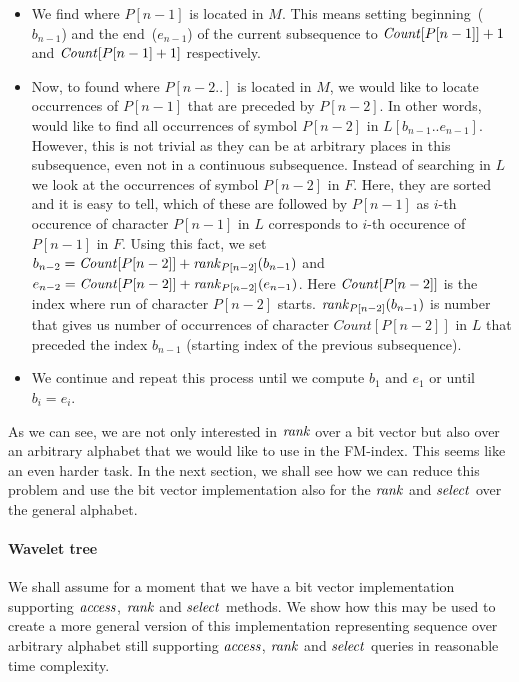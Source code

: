 \begin{itemize}
	\item We find where $P[n-1]$ is located in $M$. This means setting beginning~($b_{n-1}$) and
	the end~($e_{n-1}$) of the current subsequence to $\mathit{Count}[P[n-1]]+1$ and $\mathit{Count}[P[n-1]+1]$
	respectively.
	\item Now, to found where $P[n-2..]$ is located in $M$, we would like to locate occurrences
	of $P[n-1]$ that are preceded by $P[n-2]$. In other words, would like to find all
	occurrences of symbol $P[n-2]$ in $L[b_{n-1}..e_{n-1}]$. However, this is not trivial
	as they can be at arbitrary places in this subsequence, even not in a continuous
	subsequence. Instead of searching in $L$ we look at the occurrences of symbol $P[n-2]$ in
	$F$. Here, they are sorted and it is easy to tell, which of these are followed by
	$P[n-1]$ as $i$-th occurence of character $P[n-1]$ in $L$ corresponds to $i$-th
	occurence of $P[n-1]$ in $F$. Using this fact, we set
	$b_{n-2} = \mathit{Count}[P[n-2]] + \mathit{rank}_{P[n-2]}(b_{n-1})$ and
	$e_{n-2} = \mathit{Count}[P[n-2]] + \mathit{rank}_{P[n-2]}(e_{n-1})$. Here $\mathit{Count}[P[n-2]]$
	is the index where run of character $P[n-2]$ starts. $\mathit{rank}_{P[n-2]}(b_{n-1})$
	is number that gives us number of occurrences of character $Count[P[n-2]]$ in $L$ that
	preceded the index $b_{n-1}$ (starting index of the previous subsequence).
	\item We continue and repeat this process until we compute $b_1$ and $e_1$ or until
	$b_i=e_i$.
\end{itemize}

As we can see, we are not only interested in $\mathit{rank}$ over a bit vector but also over an arbitrary
alphabet that we would like to use in the FM-index. This seems like an even harder task.
In the next section, we shall see how we can reduce this problem and use the bit vector
implementation also for the $\mathit{rank}$ and $\mathit{select}$ over the general alphabet.

\paragraph{Wavelet tree}
\label{section:WaweletTree}

We shall assume for a moment that we have a bit vector implementation supporting
$\mathit{access}$, $\mathit{rank}$ and $\mathit{select}$ methods. We show how this may be used to create
a more general version of this implementation representing sequence over arbitrary
alphabet still supporting $\mathit{access}$, $\mathit{rank}$ and $\mathit{select}$ queries in reasonable time complexity.

